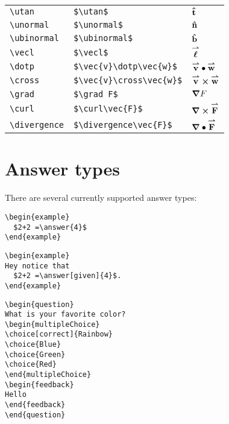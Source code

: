 \documentclass{ximera}
\begin{document}
\begin{tabular*}{1.0\textwidth}{lll}
\verb|\utan| & \verb|$\utan$| & $\mathbf{\hat{t}}$\\
\verb|\unormal| & \verb|$\unormal$| & $\mathbf{\hat{n}}$\\
\verb|\ubinormal| & \verb|$\ubinormal$| & $\mathbf{\hat{b}}$\\
\verb|\vecl| & \verb|$\vecl$| & ${\overset{\boldsymbol{\rightharpoonup}}{\mathbf{\boldsymbol{\ell}}}}$\\
\verb|\dotp| & \verb|$\vec{v}\dotp\vec{w}$| & ${\overset{\boldsymbol{\rightharpoonup}}{\mathbf{v}}}\bullet{\overset{\boldsymbol{\rightharpoonup}}{\mathbf{w}}}$\\
\verb|\cross| & \verb|$\vec{v}\cross\vec{w}$| & ${\overset{\boldsymbol{\rightharpoonup}}{\mathbf{v}}}\boldsymbol\times{\overset{\boldsymbol{\rightharpoonup}}{\mathbf{w}}}$\\
\verb|\grad| & \verb|$\grad F$| & $\boldsymbol\nabla F$\\
\verb|\curl| & \verb|$\curl\vec{F}$| & $\boldsymbol\nabla\boldsymbol\times{\overset{\boldsymbol{\rightharpoonup}}{\mathbf{F}}}$\\
\verb|\divergence| & \verb|$\divergence\vec{F}$| & $\boldsymbol\nabla\bullet{\overset{\boldsymbol{\rightharpoonup}}{\mathbf{F}}}$\\
\end{tabular*}

\section{Answer types}

There are several currently supported answer types:

\begin{verbatim}
\begin{example}
  $2+2 =\answer{4}$
\end{example}
\end{verbatim}

\begin{verbatim}
\begin{example}
Hey notice that
  $2+2 =\answer[given]{4}$.
\end{example}
\end{verbatim}

\begin{verbatim}
\begin{question}
What is your favorite color?
\begin{multipleChoice}
\choice[correct]{Rainbow}
\choice{Blue}
\choice{Green}
\choice{Red}
\end{multipleChoice}
\begin{feedback}
Hello
\end{feedback}
\end{question}
\end{verbatim}
\end{document}
